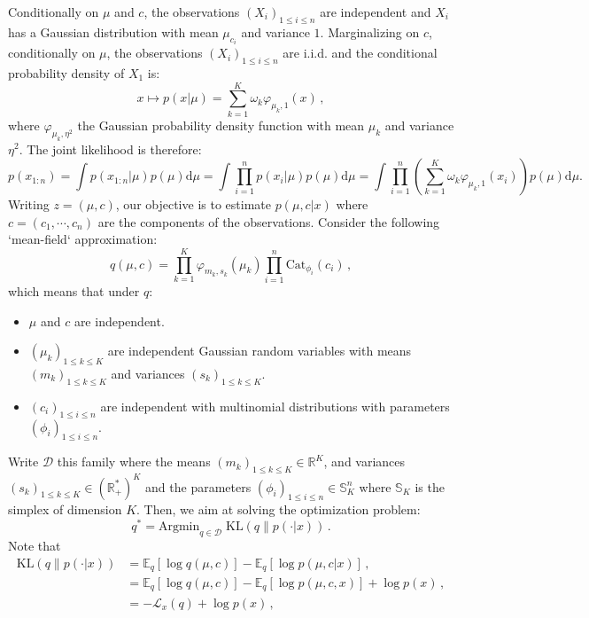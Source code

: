 \documentclass[english,graybox,envcountchap,envcountsame,sectrefs,shortlabels]{svmono}
\theoremstyle{style}
\newcommand{\eqsp}{}
\begin{document}
Conditionally on  $\mu$ and $c$, the observations $(X_i)_{1\leqslant i\leqslant n}$ are independent and $X_i$ has a Gaussian distribution with mean $\mu_{c_i}$ and variance $1$. Marginalizing on $c$, conditionally on  $\mu$, the observations $(X_i)_{1\leqslant i\leqslant n}$ are i.i.d. and the conditional probability density of $X_1$ is:
$$
x\mapsto p(x|\mu) = \sum_{k=1}^K \omega_k \varphi_{\mu_k,1}(x)\,,
$$
where $\varphi_{\mu_k,\eta^2}$ the Gaussian probability density function with mean $\mu_k$ and  variance $\eta^2$. The joint likelihood is therefore:
$$
p(x_{1:n}) = \int p(x_{1:n}|\mu) p(\mu) \mathrm{d} \mu = \int \prod_{i=1}^n p(x_i|\mu) p(\mu) \mathrm{d} \mu = \int \prod_{i=1}^n \left(\sum_{k=1}^K \omega_k \varphi_{\mu_k,1}(x_i)\right) p(\mu) \mathrm{d} \mu\eqsp.
$$
Writing $z = (\mu,c)$, our objective is to estimate $p(\mu,c|x)$ where $c = (c_1,\cdots,c_n)$ are the components of the observations. Consider the following `mean-field` approximation:
$$
q(\mu,c) = \prod_{k=1}^K \varphi_{m_k,s_k}(\mu_k)\prod_{i=1}^n \mathrm{Cat}_{\phi_i}(c_i)\,, 
$$
which means that under $q$:
\begin{itemize}
\item $\mu$ and  $c$ are independent.
\item $(\mu_{k})_{1\leqslant k \leqslant K}$ are independent Gaussian random variables with means $(m_{k})_{1\leqslant k \leqslant K}$ and variances $(s_{k})_{1\leqslant k \leqslant K}$.
\item $(c_{i})_{1\leqslant i \leqslant n}$ are independent with  multinomial distributions with parameters  $(\phi_i)_{1\leqslant i \leqslant n}$.%
\end{itemize}
Write $\mathcal{D}$ this family where the means $(m_{k})_{1\leqslant k \leqslant K}\in \mathbb{R}^K$, and variances $(s_{k})_{1\leqslant k \leqslant K}\in (\mathbb{R}_+^*)^K$ and the parameters  $(\phi_i)_{1\leqslant i \leqslant n}\in \mathbb{S}_K^n$ where $\mathbb{S}_K$ is the simplex of dimension $K$.  Then, we aim at solving the optimization problem:
$$
q^* = \mathrm{Argmin}_{q\in\mathcal{D}}\; \mathrm{KL}\left(q\|p(\cdot|x)\right)\,.
$$
Note that
\begin{align*}
\mathrm{KL}\left(q\|p(\cdot|x)\right) &= \mathbb{E}_q[\log q(\mu,c)] - \mathbb{E}_q[\log p(\mu,c|x)]\,,\\
 &= \mathbb{E}_q[\log q(\mu,c)] - \mathbb{E}_q[\log p(\mu,c,x)]+\log p(x)\,,\\
&= -\mathcal{L}_x(q)+\log p(x)\,,
\end{align*}
\end{document}
